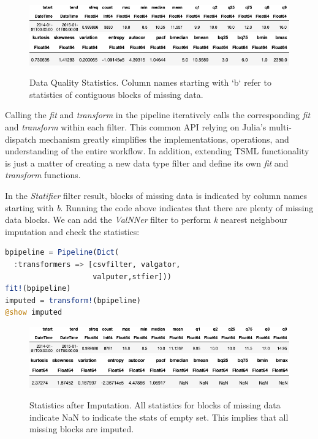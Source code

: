 \documentclass{juliacon}
\begin{document}
\begin{figure}[htbp]
   \centering
   \includegraphics[width=\columnwidth]{stat1.png} %
   \vskip 2pt
      \includegraphics[width=\columnwidth]{stat2.png} %
   \caption{Data Quality Statistics. Column names starting with `b` refer to statistics of contiguous blocks of missing data.}
   \label{fig:dataquality}
\end{figure}

Calling the \emph{fit} and \emph{transform} in the pipeline
iteratively calls the corresponding \emph{fit} and \emph{transform} within each filter. 
This common API relying on Julia's multi-dispatch mechanism greatly simplifies the implementations, operations, 
and understanding of the entire workflow. In addition, extending TSML functionality is just a 
matter of creating a new data type filter and define its own  \emph{fit} and \emph{transform} 
functions.

\vskip 3pt

In the \emph{Statifier} filter result, blocks of missing data is indicated by column names starting
with \emph{b}. Running the code above indicates that there are plenty of missing data blocks.
We can add the \emph{ValNNer} filter to perform \emph{k} nearest neighbour imputation and check
the statistics:

\begin{lstlisting}[language = Julia]
bpipeline = Pipeline(Dict(
  :transformers => [csvfilter, valgator, 
                    valputer,stfier]))
fit!(bpipeline)
imputed = transform!(bpipeline)
@show imputed
\end{lstlisting}

\begin{figure}[htbp]
   \centering
   \includegraphics[width=\columnwidth]{imputed1.png} %
   \vskip 2pt
      \includegraphics[width=\columnwidth]{imputed2.png} %
   \caption{Statistics after Imputation. All statistics for blocks of missing data indicate NaN to indicate the stats of empty set. This implies that all missing blocks are imputed.}
   \label{fig:imputation}
\end{figure}
\end{document}
